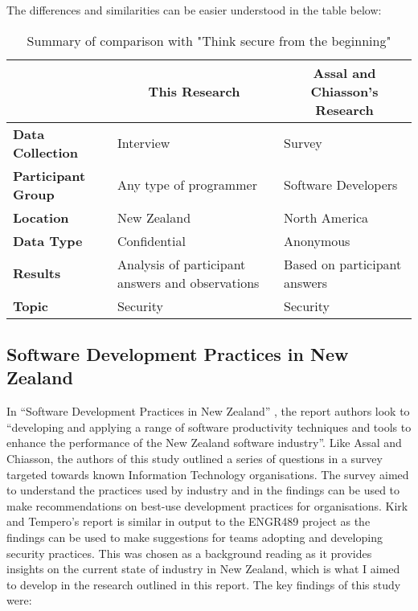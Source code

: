 The differences and similarities can be easier understood in the table below:
\newline
\begin{table}[htb]
\begin{tabular}{|l|l|l|}
\hline
\multicolumn{1}{|c|}{} &
\multicolumn{1}{|c|}{\textbf{This Research}}              & \multicolumn{1}{c|}{\textbf{Assal and Chiasson's Research}} \\ \hline
\textbf{Data Collection} & Interview                 & Survey                 \\ \hline
\textbf{Participant Group}                  & Any type of programmer  & Software Developers                                        \\ \hline
\textbf{Location}             & New Zealand        & North America   \\ \hline
\textbf{Data Type}     & Confidential & Anonymous \\ \hline
\textbf{Results}              & Analysis of participant answers and observations & Based on participant answers                  \\ \hline
\textbf{Topic}                & Security                  & Security \\ \hline
\end{tabular}
\centering
\newline
\caption{Summary of comparison with "Think secure from the beginning"}
\centering
\end{table}

\subsection{Software Development Practices in New Zealand}

\par In “Software Development Practices in New Zealand” \cite{summary2}, the report authors look to “developing and applying a range of software productivity techniques and tools to enhance the performance of the New Zealand software industry”. Like Assal and Chiasson, the authors of this study outlined a series of questions in a survey targeted towards known Information Technology organisations. The survey aimed to understand the practices used by industry and in the findings can be used to make recommendations on best-use development practices for organisations. Kirk and Tempero’s report is similar in output to the ENGR489 project as the findings can be used to make suggestions for teams adopting and developing security practices. This was chosen as a background reading as it provides insights on the current state of industry in New Zealand, which is what I aimed to develop in the research outlined in this report. 
\newline
\newline
The key findings of this study were:

